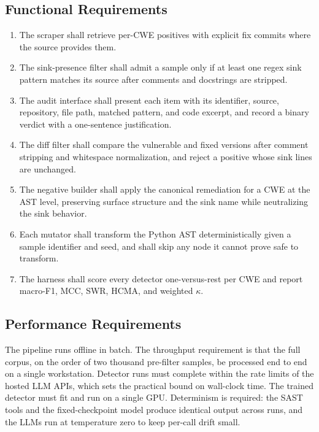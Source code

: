\subsection{Functional Requirements}

\begin{enumerate}
  \item The scraper shall retrieve per-CWE positives with explicit fix commits
    where the source provides them.
  \item The sink-presence filter shall admit a sample only if at least one
    regex sink pattern matches its source after comments and docstrings are
    stripped.
  \item The audit interface shall present each item with its identifier,
    source, repository, file path, matched pattern, and code excerpt, and
    record a binary verdict with a one-sentence justification.
  \item The diff filter shall compare the vulnerable and fixed versions after
    comment stripping and whitespace normalization, and reject a positive whose
    sink lines are unchanged.
  \item The negative builder shall apply the canonical remediation for a CWE at
    the AST level, preserving surface structure and the sink name while
    neutralizing the sink behavior.
  \item Each mutator shall transform the Python AST deterministically given a
    sample identifier and seed, and shall skip any node it cannot prove safe to
    transform.
  \item The harness shall score every detector one-versus-rest per CWE and
    report macro-F1, MCC, SWR, HCMA, and weighted $\kappa$.
\end{enumerate}

\subsection{Performance Requirements}

The pipeline runs offline in batch. The throughput requirement is that the full
corpus, on the order of two thousand pre-filter samples, be processed end to
end on a single workstation. Detector runs must complete within the rate limits
of the hosted LLM APIs, which sets the practical bound on wall-clock time. The
trained detector must fit and run on a single GPU. Determinism is required: the
SAST tools and the fixed-checkpoint model produce identical output across runs,
and the LLMs run at temperature zero to keep per-call drift small.

